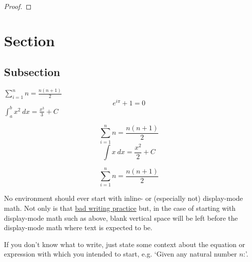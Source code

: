 \begin{proof}
    \lipsum[1]
\end{proof}

\begin{coro}
    \lipsum[][1-4]
\end{coro}

\section{Section}

\lipsum[1-2]

\subsection{Subsection}

\lipsum[][1-9]

\begin{defn}
    \lipsum[][1] \(\sum_{i=1}^{n} n = \frac{n(n+1)}{2}\) \lipsum[][2-3]
    \[e^{i\pi}+1 = 0\]
    \lipsum[][4] \(\int_{a}^{b} x^2 \ dx = \frac{x^3}{3} + C\) \lipsum[][5-6]
\end{defn}

\begin{nota}
    \lipsum[][1-3]
    \[\sum_{i=1}^{n} n = \frac{n(n+1)}{2}\]
    \lipsum[][4-5]
    \[\int x \ dx = \frac{x^2}{2} + C\]
    \lipsum[][6-7]
\end{nota}

\begin{defn}
    \[\sum_{i=1}^{n} n = \frac{n(n+1)}{2}\]
    \lipsum[][3-5]
\end{defn}

\begin{rmrk}
    No environment should ever start with inline- or (especially not) display-mode math. Not only is that \href{https://kconrad.math.uconn.edu/blurbs/proofs/writingtips.pdf}{bad writing practice} but, in the case of starting with display-mode math such as above, blank vertical space will be left before the display-mode math where text is expected to be.

    If you don't know what to write, just state some context about the equation or expression with which you intended to start, e.g. `Given any natural number \(n\):'.
\end{rmrk}

